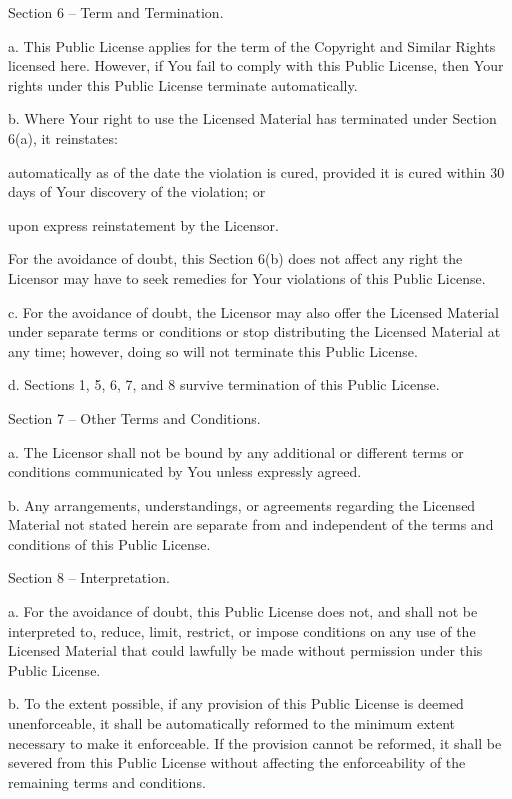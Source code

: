 Section 6 -- Term and Termination.

a. This Public License applies for the term of the Copyright and Similar Rights licensed here. However, if You fail to comply with this Public License, then Your rights under this Public License terminate automatically.

b. Where Your right to use the Licensed Material has terminated under Section 6(a), it reinstates\+:


\begin{DoxyEnumerate}
\item automatically as of the date the violation is cured, provided it is cured within 30 days of Your discovery of the violation; or
\item upon express reinstatement by the Licensor.
\end{DoxyEnumerate}

For the avoidance of doubt, this Section 6(b) does not affect any right the Licensor may have to seek remedies for Your violations of this Public License.

c. For the avoidance of doubt, the Licensor may also offer the Licensed Material under separate terms or conditions or stop distributing the Licensed Material at any time; however, doing so will not terminate this Public License.

d. Sections 1, 5, 6, 7, and 8 survive termination of this Public License.

Section 7 -- Other Terms and Conditions.

a. The Licensor shall not be bound by any additional or different terms or conditions communicated by You unless expressly agreed.

b. Any arrangements, understandings, or agreements regarding the Licensed Material not stated herein are separate from and independent of the terms and conditions of this Public License.

Section 8 -- Interpretation.

a. For the avoidance of doubt, this Public License does not, and shall not be interpreted to, reduce, limit, restrict, or impose conditions on any use of the Licensed Material that could lawfully be made without permission under this Public License.

b. To the extent possible, if any provision of this Public License is deemed unenforceable, it shall be automatically reformed to the minimum extent necessary to make it enforceable. If the provision cannot be reformed, it shall be severed from this Public License without affecting the enforceability of the remaining terms and conditions.

